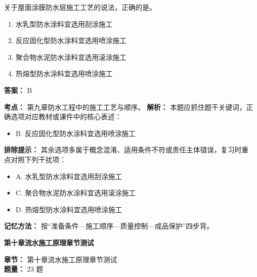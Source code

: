 \documentclass[UTF8,fontset=fandol,11pt]{ctexart}
\newcommand{\chaptertitle}[1]{\vspace{0.5em}\begin{tcolorbox}[enhanced,colback=deepblue,colframe=deepblue,arc=2mm,boxrule=0pt]\begin{center}\Large\bfseries\color{white}#1\end{center}\end{tcolorbox}\vspace{0.5em}}
\begin{document}
\begin{quizbox}[title={第 7 题}]
关于屋面涂膜防水层施工工艺的说法，正确的是。\\
\begin{enumerate}[label=\Alph*.]
\item 水乳型防水涂料宜选用刮涂施工
\item 反应固化型防水涂料宜选用喷涂施工
\item 聚合物水泥防水涂料宜选用滚涂施工
\item 热熔型防水涂料宜选用喷涂施工
\end{enumerate}
\textbf{答案：} B
\vspace{0.25em}
\begin{answerbox}[title={考点解析}]
\textbf{考点：} 第九章防水工程中的施工工艺与顺序。
\textbf{解析：} 本题应抓住题干关键词，正确选项对应教材或课件中的核心表述：
\begin{itemize}
\item B. 反应固化型防水涂料宜选用喷涂施工
\end{itemize}
\textbf{排除提示：} 其余选项多属于概念混淆、适用条件不符或责任主体错误，复习时重点对照下列干扰项：
\begin{itemize}
\item A. 水乳型防水涂料宜选用刮涂施工
\item C. 聚合物水泥防水涂料宜选用滚涂施工
\item D. 热熔型防水涂料宜选用喷涂施工
\end{itemize}
\textbf{记忆方法：} 按“准备条件—施工顺序—质量控制—成品保护”四步背。
\end{answerbox}
\end{quizbox}

\chaptertitle{第十章流水施工原理章节测试}
\begin{mainbox}
\textbf{\textcolor{mainblue}{章节：}} 第十章流水施工原理章节测试\\
\textbf{\textcolor{answerred}{题量：}} 23 题
\end{mainbox}
\end{document}
